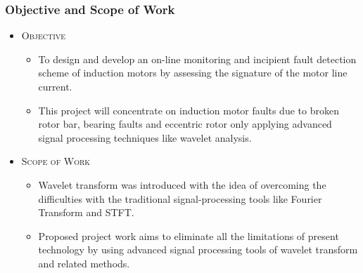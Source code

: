 \documentclass[9pt]{beamer}
\begin{document}
\begin{frame}
\frametitle{Objective and Scope of Work}

\begin{itemize} 
\item \textsc{Objective}
    \begin{itemize}
    \item To design and develop an on-line monitoring and incipient fault detection scheme of induction motors by assessing the signature of the motor line current.
    \item This  project  will concentrate on induction motor faults due to broken rotor bar, bearing faults and eccentric rotor only applying  advanced  signal processing techniques like wavelet analysis.
    \end{itemize}
\item \textsc{Scope of Work}
    \begin{itemize}
    \item Wavelet transform was introduced with the idea of overcoming the difficulties with the traditional signal-processing tools like Fourier Transform and STFT.
    \item Proposed project work aims to eliminate all the limitations of present technology by using advanced signal processing tools of wavelet transform and related methods.
    \end{itemize}
\end{itemize}
\end{frame}
\end{document}
